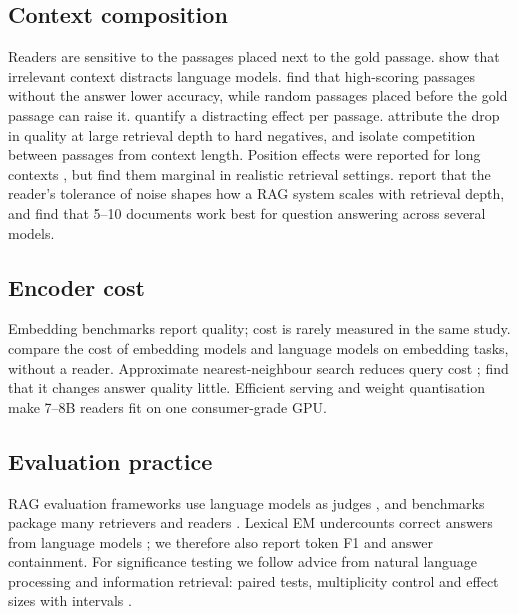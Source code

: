 \subsection{Context composition}
Readers are sensitive to the passages placed next to the gold passage. \citet{shi2023distracted} show that irrelevant context distracts language models. \citet{cuconasu2024power} find that high-scoring passages without the answer lower accuracy, while random passages placed before the gold passage can raise it. \citet{amiraz2025distracting} quantify a distracting effect per passage. \citet{jin2024longcontext} attribute the drop in quality at large retrieval depth to hard negatives, and \citet{repantis2026competition} isolate competition between passages from context length. Position effects were reported for long contexts \citep{liu2024lost}, but \citet{cuconasu2025positional} find them marginal in realistic retrieval settings. \citet{hsia2025ragged} report that the reader's tolerance of noise shapes how a RAG system scales with retrieval depth, and \citet{zhao2026design} find that 5--10 documents work best for question answering across several models.

\subsection{Encoder cost}
Embedding benchmarks report quality; cost is rarely measured in the same study. \citet{elassadi2026embedder} compare the cost of embedding models and language models on embedding tasks, without a reader. Approximate nearest-neighbour search reduces query cost \citep{malkov2020hnsw,johnson2021faiss}; \citet{leto2024toward} find that it changes answer quality little. Efficient serving \citep{kwon2023vllm} and weight quantisation \citep{lin2024awq} make 7--8B readers fit on one consumer-grade GPU.

\subsection{Evaluation practice}
RAG evaluation frameworks use language models as judges \citep{es2024ragas,saadfalcon2024ares,zheng2023judge}, and benchmarks package many retrievers and readers \citep{rau2024bergen,petroni2021kilt,lyu2025crud}. Lexical EM undercounts correct answers from language models \citep{kamalloo2023}; we therefore also report token F1 and answer containment. For significance testing we follow advice from natural language processing and information retrieval: paired tests, multiplicity control and effect sizes with intervals \citep{dror2018,smucker2007,sakai2014}.
